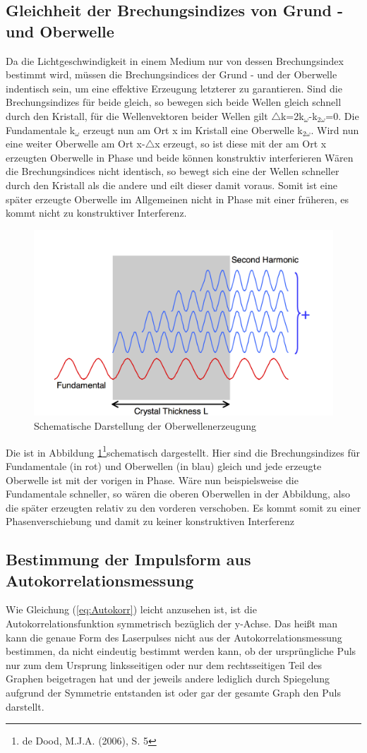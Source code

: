 \subsection{Gleichheit der Brechungsindizes von Grund - und Oberwelle}
Da die Lichtgeschwindigkeit in einem Medium nur von dessen Brechungsindex bestimmt wird, müssen die Brechungsindices der Grund - und der Oberwelle indentisch sein, um eine effektive Erzeugung letzterer zu garantieren. \newline
Sind die Brechungsindizes für beide gleich, so bewegen sich beide Wellen gleich schnell durch den Kristall, für die Wellenvektoren beider Wellen gilt $\triangle$k=2k$_\omega$-k$_{2\omega}$=0. Die Fundamentale k$_\omega$ erzeugt nun am Ort x im Kristall eine Oberwelle k$_{2\omega}$. Wird nun eine weiter Oberwelle am Ort x-$\triangle$x erzeugt, so ist diese mit der am Ort x erzeugten Oberwelle in Phase und beide können konstruktiv interferieren
Wären die Brechungsindices nicht identisch, so bewegt sich eine der Wellen schneller durch den Kristall als die andere und eilt dieser damit voraus. Somit ist eine später erzeugte Oberwelle im Allgemeinen nicht in Phase mit einer früheren, es kommt nicht zu konstruktiver Interferenz. 
\begin{figure}
	\centering
	\includegraphics[width=0.7\linewidth]{Bilder/Oberwelle}
	\caption{Schematische Darstellung der Oberwellenerzeugung}
	\label{fig:oberwelle}
\end{figure}
Die ist in Abbildung \ref{fig:oberwelle}\footnote{de Dood, M.J.A. (2006), S. 5}schematisch dargestellt. Hier sind die Brechungsindizes für Fundamentale (in rot) und Oberwellen (in blau) gleich und jede erzeugte Oberwelle ist mit der vorigen in Phase. Wäre nun beispielsweise die Fundamentale schneller, so wären die oberen Oberwellen in der Abbildung, also die später erzeugten relativ zu den vorderen verschoben. Es kommt somit zu einer Phasenverschiebung und damit zu keiner konstruktiven Interferenz
\subsection{Bestimmung der Impulsform aus Autokorrelationsmessung}
Wie Gleichung (\ref{eq:Autokorr}) leicht anzusehen ist, ist die Autokorrelationsfunktion symmetrisch bezüglich der y-Achse. Das heißt man kann die genaue Form des Laserpulses nicht aus der Autokorrelationsmessung bestimmen, da nicht eindeutig bestimmt werden kann, ob der ursprüngliche Puls nur zum dem Ursprung linksseitigen oder nur dem rechtsseitigen Teil des Graphen beigetragen hat und der jeweils andere lediglich durch Spiegelung aufgrund der Symmetrie entstanden ist oder gar der gesamte Graph den Puls darstellt.
